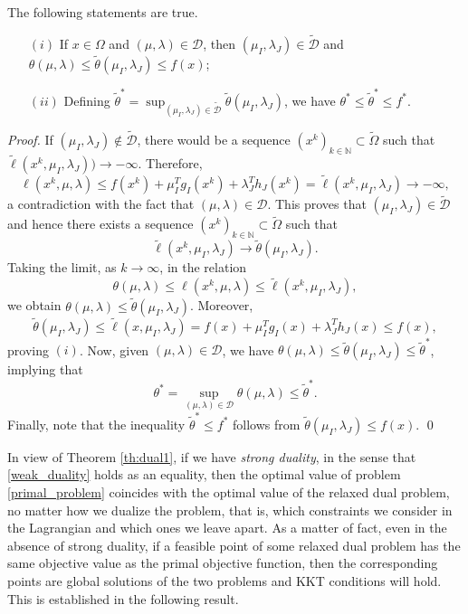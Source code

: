 \documentclass[smallextended,referee,envcountsect]{svjour3}
\begin{document}
\begin{theorem}
\label{th:dual1}
The following statements are true. 
\begin{itemize}
\item[$(i)$] If $x\in\Omega$ and $(\mu,\lambda)\in\mathcal{D}$, then 
$(\mu_I,\lambda_J)\in\mathcal{\widetilde D}$ and 
$\theta(\mu,\lambda)\leq\tilde\theta(\mu_I,\lambda_J)\leq f(x)$; 
\item[$(ii)$] Defining 
$\tilde\theta^*=
\sup_{(\mu_I,\lambda_J)\in\mathcal{\widetilde D}}\tilde\theta(\mu_I,\lambda_J)$, 
we have $\theta^*\leq\tilde\theta^*\leq f^*$.
\end{itemize}
\end{theorem}
\begin{proof}
If $(\mu_I,\lambda_J)\notin\mathcal{\widetilde D}$, there would be a sequence 
$(x^k)_{k\in\mathbb{N}}\subset\widetilde\Omega$ such that 
$\tilde\ell(x^k,\mu_I,\lambda_J))\to-\infty$. Therefore, 
$$
\ell(x^k,\mu,\lambda)\leq f(x^k)+\mu_I^Tg_I(x^k)+\lambda_J^Th_J(x^k)=
\tilde\ell(x^k,\mu_I,\lambda_J)\to-\infty,
$$
a contradiction with the fact that $(\mu,\lambda)\in\mathcal{D}$. This proves that 
$(\mu_I,\lambda_J)\in\mathcal{\widetilde D}$ and hence there exists a sequence 
$(x^k)_{k\in\mathbb{N}}\subset\widetilde\Omega$ such that 
$$
\tilde\ell(x^k,\mu_I,\lambda_J)\to\tilde\theta(\mu_I,\lambda_J).
$$
Taking the limit, as $k\to\infty$, in the relation 
$$
\theta(\mu,\lambda)\leq\ell(x^k,\mu,\lambda)\leq\tilde\ell(x^k,\mu_I,\lambda_J),
$$
we obtain  $\theta(\mu,\lambda)\leq\tilde\theta(\mu_I,\lambda_J)$. Moreover, 
$$
\tilde\theta(\mu_I,\lambda_J)\leq\tilde\ell(x,\mu_I,\lambda_J)=
f(x)+\mu_I^Tg_I(x)+\lambda_J^Th_J(x)\leq f(x),
$$
proving $(i)$. Now, given $(\mu,\lambda)\in\mathcal{D}$, we have  
$\theta(\mu,\lambda)\leq\tilde\theta(\mu_I,\lambda_J)\leq\tilde\theta^*$, implying that 
$$
\theta^*=\sup_{(\mu,\lambda)\in\mathcal{D}}\theta(\mu,\lambda)\leq\tilde\theta^*.
$$
Finally, note that the inequality $\tilde\theta^*\leq f^*$ follows from 
$\tilde\theta(\mu_I,\lambda_J)\leq f(x)$.
\qed\end{proof}

\begin{remark}
\label{rm:strong}
In view of Theorem \ref{th:dual1}, if we have {\em strong duality}, in the sense that 
\eqref{weak_duality} holds as an equality, then the optimal value of 
problem \eqref{primal_problem} coincides with the optimal value of the relaxed dual 
problem, no matter how we dualize the problem, that is, which constraints we consider 
in the Lagrangian and which ones we leave apart. As a matter of fact, even in the 
absence of strong duality, if a feasible point of some relaxed dual problem has the 
same objective value as the primal objective function, then the corresponding points 
are global solutions of the two problems and KKT conditions will hold. This is 
established in the following result.
\end{remark}
\end{document}
